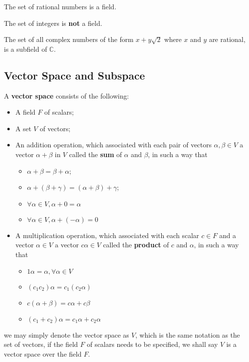 					\begin{example}
						The set of rational numbers is a field.
					\end{example}

					\begin{example}
						The set of integers is \textbf{not} a field.
					\end{example}

					\begin{example}
						The set of all complex numbers of the form $x + y\sqrt{2}$ where $x$ and $y$ are rational, is a subfield of $\mathbb{C}$.
					\end{example}

				\subsection{Vector Space and Subspace}
					\begin{definition}
						A \textbf{vector space} consists of the following:
						\begin{itemize}
							\item A field $F$ of scalars;
							\item A set $V$ of vectors;
							\item An addition operation, which associated with each pair of vectors $\alpha, \beta \in V$ a vector $\alpha + \beta$ in $V$ called the \textbf{sum} of $\alpha$ and $\beta$, in such a way that
							\begin{itemize}
								\item $\alpha + \beta = \beta + \alpha$;
								\item $\alpha + (\beta + \gamma) = (\alpha + \beta) + \gamma$;
								\item $\forall \alpha \in V, \alpha + 0 = \alpha$
								\item $\forall \alpha \in V, \alpha + (-\alpha) = 0$
							\end{itemize}
							\item A multiplication operation, which associated with each scalar $c \in F$ and a vector $\alpha \in V$ a vector $c\alpha \in V$ called the \textbf{product} of $c$ and $\alpha$, in such a way that
							\begin{itemize}
								\item $1\alpha = \alpha, \forall \alpha \in V$
								\item $(c_1c_2)\alpha = c_1(c_2\alpha)$
								\item $c(\alpha + \beta) = c\alpha + c\beta$
								\item $(c_1 + c_2) \alpha = c_1\alpha + c_2\alpha$
							\end{itemize}
						\end{itemize}
						we may simply denote the vector space as $V$, which is the same notation as the set of vectors, if the field $F$ of scalars needs to be specified, we shall say $V$ is a vector space over the field $F$.
					\end{definition}


